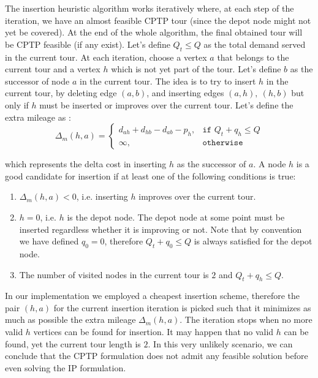 The insertion heuristic algorithm works iteratively where, at each step of the iteration, we have an almost feasible CPTP tour (since the depot node might not yet be covered).
At the end of the whole algorithm, the final obtained tour will be CPTP feasible (if any exist).
Let's define $Q_t \le Q$ as the total demand served in the current tour.
At each iteration, choose a vertex $a$ that belongs to the current tour and a vertex $h$ which is not yet part of the tour.
Let's define $b$ as the successor of node $a$ in the current tour.
The idea is to try to insert $h$ in the current tour, by deleting edge $(a, b)$, and inserting edges $(a, h),\ (h, b)$ but only if $h$ must be inserted or improves over the current tour.
Let's define the extra mileage as
:
\begin{equation}
	\Delta_m(h, a) =
	\begin{cases}
		d_{ah} + d_{hb} - d_{ab} - p_h, & \texttt{if } Q_t + q_h \le Q \\
		\infty,                         & \texttt{otherwise}
	\end{cases}
\end{equation}

which represents the delta cost in inserting $h$ as the successor of $a$.
A node $h$ is a good candidate for insertion if at least one of the following conditions is true:
\begin{enumerate}
	\item $\Delta_m(h, a) < 0$, i.e. inserting $h$ improves over the current tour.
	\item $h = 0$, i.e. $h$ is the depot node. The depot node at some point must be inserted regardless whether it is improving or not.
	      Note that by convention we have defined $q_0 = 0$, therefore $Q_t + q_0 \le Q$ is always satisfied for the depot node.
	\item The number of visited nodes in the current tour is $2$ and $Q_t + q_h \le Q$.
\end{enumerate}

In our implementation we employed a cheapest insertion scheme, therefore the pair $(h, a)$ for the current insertion iteration is picked such that it minimizes as much as possible the extra mileage $\Delta_m(h, a)$.
The iteration stops when no more valid $h$ vertices can be found for insertion.
It may happen that no valid $h$ can be found, yet the current tour length is $2$.
In this very unlikely scenario, we can conclude that the CPTP formulation does not admit any feasible solution before even solving the IP formulation.


